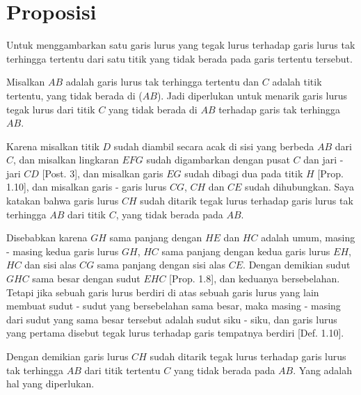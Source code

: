 \documentclass[a4paper]{book}
\begin{document}
\section*{\centering Proposisi \thesection} 
Untuk menggambarkan satu garis lurus yang tegak lurus terhadap garis
lurus tak terhingga tertentu dari satu titik yang tidak berada pada
garis tertentu tersebut.  
\begin{center}
\end{center} 
Misalkan $AB$ adalah garis lurus tak terhingga tertentu dan $C$ adalah titik 
tertentu, yang tidak berada di ($AB$). Jadi diperlukan untuk menarik garis lurus
tegak lurus dari titik $C$ yang tidak berada di $AB$ terhadap garis tak 
terhingga $AB$.

Karena misalkan titik $D$ sudah diambil secara acak di sisi yang berbeda $AB$ dari
$C$, dan misalkan lingkaran $EFG$ sudah digambarkan dengan pusat $C$ dan 
jari - jari $CD$ [Post. 3], dan misalkan garis $EG$ sudah dibagi dua pada
titik $H$ [Prop. 1.10], dan misalkan garis - garis lurus $CG$, $CH$ dan $CE$
sudah dihubungkan. Saya katakan bahwa garis lurus $CH$ sudah ditarik tegak 
lurus terhadap garis lurus tak terhingga $AB$ dari titik $C$, yang tidak 
berada pada $AB$. 

Disebabkan karena $GH$ sama panjang dengan $HE$ dan $HC$ adalah umum, 
masing - masing kedua garis lurus $GH$, $HC$ sama panjang dengan kedua garis 
lurus  $EH$, $HC$ dan sisi alas $CG$ sama panjang dengan sisi alas $CE$. 
Dengan demikian sudut $GHC$ sama besar dengan sudut $EHC$ [Prop. 1.8], dan 
keduanya  bersebelahan. Tetapi jika sebuah garis lurus berdiri di atas
sebuah garis lurus yang lain membuat sudut - sudut yang bersebelahan 
sama besar, maka masing - masing dari sudut yang sama besar tersebut adalah
sudut siku - siku, dan garis lurus yang pertama disebut tegak lurus terhadap
garis tempatnya berdiri [Def. 1.10].

Dengan demikian garis lurus $CH$ sudah ditarik tegak lurus terhadap garis
lurus tak terhingga $AB$ dari titik tertentu $C$ yang tidak berada pada
$AB$. Yang adalah hal yang diperlukan.
\end{document}
